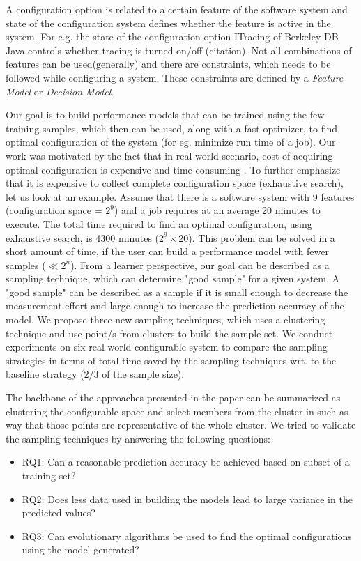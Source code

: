 \documentclass{sig-alternative}
\newcommand{\bi}{\begin{itemize}}%
\newcommand{\ei}{\end{itemize}}
\begin{document}
 A configuration option is related to a certain feature of the software system and state of the configuration system defines whether the feature is  active in the system.
 For e.g. the state of the configuration option ITracing of  Berkeley DB Java controls whether tracing is turned on/off (citation). Not all combinations of features can be used(generally) and there are constraints, which needs to be followed while configuring a system. These constraints are defined by a \textit{Feature Model}\cite{kang1990feature} or \textit{Decision Model}\cite{schmid2011comparison}. 
 
Our goal is to build performance models that can be trained using the few training samples, which then can be used, along with a fast optimizer, to find optimal configuration of the system (for eg. minimize run time of a job). Our work was motivated by the fact that in real world scenario, cost of acquiring optimal configuration is expensive and time consuming \cite{weiss2008maximizing}. To further emphasize that it is expensive to collect complete configuration space (exhaustive search), let us look at an example. Assume that there is a software system with 9 features (configuration space = $2^9$) and a job requires at an average 20 minutes to execute. The total time required to find an optimal configuration, using exhaustive search, is 4300 minutes ($2^9 \times 20$). This problem can be solved in a short amount of time, if the user can build a performance model with fewer samples ($\ll 2^n$). From a learner perspective, our goal can be described as a sampling technique, which can determine "good sample" for a given system. A "good sample" can be described as a sample if it is small enough to decrease the measurement effort and large enough to increase the prediction accuracy of the model. We propose three new sampling techniques, which uses a clustering technique and use point/s from clusters to build the sample set. We conduct experiments on six real-world configurable system to compare the sampling strategies in terms of total time saved by the sampling techniques wrt. to the baseline strategy ($2/3$ of the sample size).

The backbone of the approaches presented in the paper can be summarized as clustering the configurable space and select members from the cluster in such as way that those points are representative of the whole cluster. We tried to validate the sampling techniques by answering the following questions:
        \bi
            \item{RQ1: Can a reasonable prediction accuracy be achieved based on subset of a training set?}
            \item{RQ2: Does less data used in building the models lead to large variance in the predicted values?}
            \item{RQ3: Can evolutionary algorithms be used to find the optimal configurations using the model generated?}
        \ei
        
\end{document}
